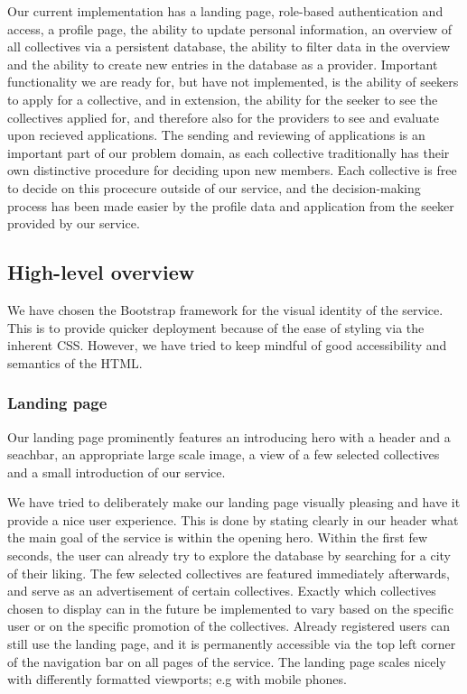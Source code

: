 Our current implementation has a landing page, role-based authentication and access, a profile page, the ability to update personal information, an overview of all collectives via a persistent database, the ability to filter data in the overview and the ability to create new entries in the database as a provider. 
Important functionality we are ready for, but have not implemented, is the ability of seekers to apply for a collective, and in extension, the ability for the seeker to see the collectives applied for, and therefore also for the providers to see and evaluate upon recieved applications. 
The sending and reviewing of applications is an important part of our problem domain, as each collective traditionally has their own distinctive procedure for deciding upon new members. Each collective is free to decide on this procecure outside of our service, and the decision-making process has been made easier by the profile data and application from the seeker provided by our service. 

\subsection{High-level overview}

We have chosen the Bootstrap framework for the visual identity of the service. This is to provide quicker deployment because of the ease of styling via the inherent CSS. However, we have tried to keep mindful of good accessibility and semantics of the HTML. 

\subsubsection{Landing page}

Our landing page prominently features an introducing hero with a header and a seachbar, an appropriate large scale image, a view of a few selected collectives and a small introduction of our service. 

We have tried to deliberately make our landing page visually pleasing and have it provide a nice user experience. 
This is done by stating clearly in our header what the main goal of the service is within the opening hero. Within the first few seconds, the user can already try to explore the database by searching for a city of their liking. 
The few selected collectives are featured immediately afterwards, and serve as an advertisement of certain collectives. Exactly which collectives chosen to display can in the future be implemented to vary based on the specific user or on the specific promotion of the collectives.
Already registered users can still use the landing page, and it is permanently accessible via the top left corner of the navigation bar on all pages of the service.
The landing page scales nicely with differently formatted viewports; e.g with mobile phones. 

